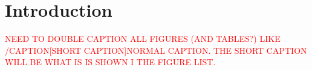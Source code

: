 \chapter{Introduction}
\label{chap:Introduction}



\textcolor{red}{NEED TO DOUBLE CAPTION ALL FIGURES (AND TABLES?) LIKE /CAPTION[SHORT CAPTION]{NORMAL CAPTION}. THE SHORT CAPTION WILL BE WHAT IS IS SHOWN I THE FIGURE LIST.}
